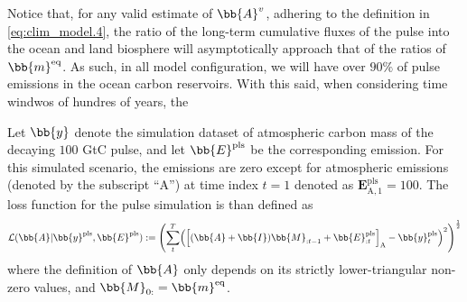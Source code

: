 \begin{table}[t]
\centering
\small
{}
\label{tab:1}
\caption{Equilibrium masses in the different carbon reservoirs are shown for each configuration. For all configurations, $\text{O}_1$ and $\text{O}_2$ represent the upper and lower-ocean, respectively. In the $4$PR model, $\text{L}_1$ denotes the total land-biosphere equilibrium mass, while the $5$PR configuration subdivides the land-biosphere into vegetation $\text{L}_1$ and soils $\text{L}_2$. These masses correspond to the 1765 conditions, when the Earth's carbon cycle is assumed to be at equilibrium (for details, refer to \cite{2431585063dd4b78b890f885bb19642e} and the references therein).
    }
\label{tab:1}
\end{table}







Notice that, for any valid estimate of $\bb{A}^v$, adhering to the definition in \eqref{eq:clim_model.4}, the ratio of the long-term cumulative fluxes of the pulse into the ocean and land biosphere will asymptotically approach that of the ratios of $\bb{m}^{\text{eq}}$.
As such, in all model configuration, we will have over $90\%$ of pulse emissions in the ocean carbon reservoirs. 
With this said, when considering time windwos of hundres of years, the 















Let $\bb{y}$ denote the simulation dataset of atmospheric carbon mass of the decaying $100$ GtC pulse, and let $\bb{E}^{\text{pls}}$ be the corresponding emission. 
For this simulated scenario, the emissions are zero except for atmospheric emissions (denoted by the subscript ``A'') at time index $t=1$ denoted as $\mathbf{E}^{\text{pls}}_{\text{A},1}=100$. 
The loss function for the pulse simulation is than defined as 
%
\begin{align} \label{eq:clim_model.5}
	\mathcal{L}(\bb{A}|\bb{y}^{\text{pls}},\bb{E}^{\text{pls}}) 
	:= \Biggl( 
	\sum_{t}^T \Bigl(  
	\Bigl[ ( \bb{A} + \bb{I})\bb{M}_{:t-1}+\bb{E}^{\text{pls}}_{:t}\Bigr]_{\text{A}}-\bb{y}^{\text{pls}}_{t} 
	\Bigr)^{2} 
	\Biggr)^{\frac{1}{2}}
\end{align}
%
where the definition of $\bb{A}$ only depends on its strictly lower-triangular non-zero values, and $\bb{M}_{0:}=\bb{m}^{\text{eq}}$. 


